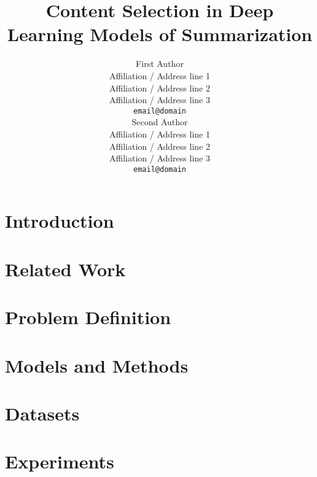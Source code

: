 \documentclass[11pt,a4paper]{article}
\title{Content Selection in Deep Learning Models of Summarization}
\author{First Author \\
  Affiliation / Address line 1 \\
  Affiliation / Address line 2 \\
  Affiliation / Address line 3 \\
  {\tt email@domain} \\\And
  Second Author \\
  Affiliation / Address line 1 \\
  Affiliation / Address line 2 \\
  Affiliation / Address line 3 \\
  {\tt email@domain} \\}
\date{}
\begin{document}
\maketitle
\begin{abstract}
\end{abstract}



\section{Introduction}


\section{Related Work}


\section{Problem Definition}


\section{Models and Methods}


\section{Datasets}


\section{Experiments}

\end{document}
